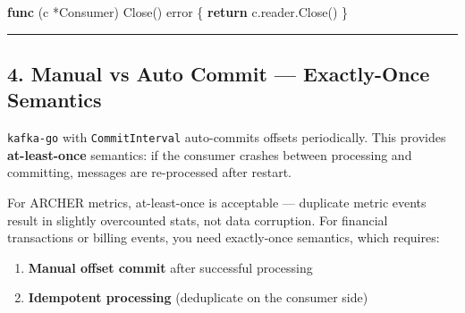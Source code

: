 \documentclass[
]{article}
\newenvironment{Shaded}{}{}
\newcommand{\ControlFlowTok}[1]{\textcolor[rgb]{0.00,0.44,0.13}{\textbf{#1}}}
\newcommand{\DataTypeTok}[1]{\textcolor[rgb]{0.56,0.13,0.00}{#1}}
\newcommand{\KeywordTok}[1]{\textcolor[rgb]{0.00,0.44,0.13}{\textbf{#1}}}
\newcommand{\NormalTok}[1]{#1}
\newcommand{\OperatorTok}[1]{\textcolor[rgb]{0.40,0.40,0.40}{#1}}
\providecommand{\tightlist}{%
  \setlength{\itemsep}{0pt}\setlength{\parskip}{0pt}}
\begin{document}
\begin{Shaded}
\begin{Highlighting}[]
\KeywordTok{func} \OperatorTok{(}\NormalTok{c }\OperatorTok{*}\NormalTok{Consumer}\OperatorTok{)}\NormalTok{ Close}\OperatorTok{()} \DataTypeTok{error} \OperatorTok{\{}
    \ControlFlowTok{return}\NormalTok{ c}\OperatorTok{.}\NormalTok{reader}\OperatorTok{.}\NormalTok{Close}\OperatorTok{()}
\OperatorTok{\}}
\end{Highlighting}
\end{Shaded}

\begin{center}\rule{0.5\linewidth}{0.5pt}\end{center}

\hypertarget{manual-vs-auto-commit-exactly-once-semantics}{%
\subsection{4. Manual vs Auto Commit --- Exactly-Once
Semantics}\label{manual-vs-auto-commit-exactly-once-semantics}}

\texttt{kafka-go} with \texttt{CommitInterval} auto-commits offsets
periodically. This provides \textbf{at-least-once} semantics: if the
consumer crashes between processing and committing, messages are
re-processed after restart.

For ARCHER metrics, at-least-once is acceptable --- duplicate metric
events result in slightly overcounted stats, not data corruption. For
financial transactions or billing events, you need exactly-once
semantics, which requires:

\begin{enumerate}
\def\labelenumi{\arabic{enumi}.}
\tightlist
\item
  \textbf{Manual offset commit} after successful processing
\item
  \textbf{Idempotent processing} (deduplicate on the consumer side)
\end{enumerate}
\end{document}
